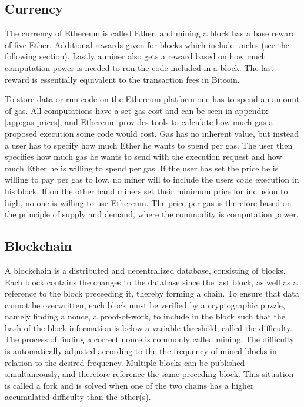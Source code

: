\documentclass{article}
\begin{document}
		\subsection{Currency}
		The currency of Ethereum is called Ether, and mining a block has a base reward of five Ether.
		Additional rewards given for blocks which include uncles (see the following section). 
		Lastly a miner also gets a reward based on how much computation power is needed to run the code included in a block. 
		The last reward is essentially equivalent to the transaction fees in Bitcoin.

		To store data or run code on the Ethereum platform one has to spend an amount of gas. 
		All computations have a set gas cost and can be seen in appendix \ref{app:gas-prices}, and Ethereum provides tools to calculate how much gas a proposed execution some code would cost.
		Gas has no inherent value, but instead a user has to specify how much Ether he wants to spend per gas. 
		The user then specifies how much gas he wants to send with the execution request and how much Ether he is willing to spend per gas. If the user has set the price he is willing to pay per gas to low, no miner will to include the users code execution in his block.
		If on the other hand miners set their minimum price for inclusion to high, no one is willing to use Ethereum. 
		The price per gas is therefore based on the principle of supply and demand, where the commodity is computation power.

		\subsection{Blockchain}
		A blockchain is a distributed and decentralized database, consisting of blocks\cite{bitcoin-white-paper}. 
		Each block contains the changes to the database since the last block, as well as a reference to the block preceeding it, thereby forming a chain.
		To ensure that data cannot be overwritten, each block must be verified by a cryptographic puzzle, namely finding a nonce, a proof-of-work, to include in the block such that the hash of the block information is below a variable threshold, called the difficulty\cite{bitcoin-white-paper}. 
		The process of finding a correct nonce is commonly called mining.
		The difficulty is automatically adjusted according to the the frequency of mined blocks in relation to the desired frequency.
		Multiple blocks can be published simultaneously, and therefore reference the same preceding block. This situation is called a fork and is solved when one of the two chains has a higher accumulated difficulty than the other(s).
\end{document}
